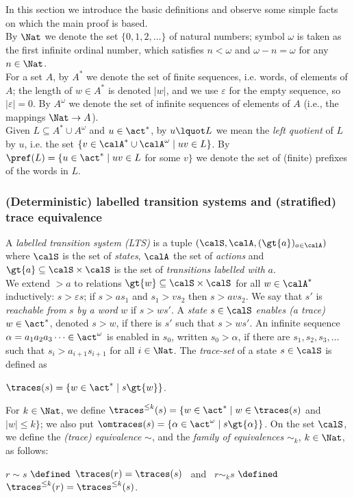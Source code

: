 \documentclass[12pt]{article}
\begin{document}
In this section we introduce the basic definitions and observe 
some simple facts on which the main proof is based. 
\\
By $\Nat$ we denote the 
set $\{0,1,2,\dots\}$ of natural numbers; symbol $\omega$ 
is taken as the first infinite ordinal number,
which satisfies $n<\omega$ and $\omega-n=\omega$ for any
$n\in \Nat$.
\\
For a set $A$, by $A^*$ 
we denote the set of finite sequences, i.e. words, of
elements of $A$; the length of $w\in A^*$ is denoted 
$|w|$,
and we use $\varepsilon$ for the empty sequence,
so $|\varepsilon|=0$.
By $A^{\omega}$ we denote the set of infinite
sequences of
elements of $A$ (i.e., the mappings $\Nat\rightarrow A$).
\\
Given 
$L\subseteq A^*\cup A^{\omega}$
and $u\in\act^*$, by $u\lquot L$ we mean the
\emph{left quotient} of $L$ by $u$, i.e. the set
$\{v\in\calA^*\cup\calA^{\omega}\mid uv\in L\}$. 
By $\pref(L)=\{u\in\act^* \mid uv\in L$ for some
$v\}$ we denote the set of (finite) prefixes of the words in $L$.

\subsubsection*{(Deterministic) labelled transition systems and 
(stratified) trace
equivalence}


A \emph{labelled transition system (LTS)} is a tuple
$(\calS,\calA,(\gt{a})_{a\in\calA} )$
where $\calS$ is the set of \emph{states}, $\calA$ the set of
\emph{actions} 
and $\gt{a}\subseteq \calS\times\calS$ is the set of
\emph{transitions labelled with} $a$.
\\
We extend $\gt{a}$ to relations $\gt{w}\subseteq
\calS\times \calS$ for all $w\in\calA^*$ inductively:
$s\gt{\varepsilon}s$; if $s\gt{a}s_1$ and $s_1\gt{v}s_2$ then
$s\gt{av}s_2$. We say that $s'$ is \emph{reachable 
from} $s$ \emph{by
a word} $w$ if $s\gt{w}s'$.
A \emph{state} $s\in\calS$ \emph{enables (a trace)}
$w\in\act^*$, denoted $s\gt{w}$, if there is $s'$ such that 
 $s\gt{w}s'$. An infinite sequence 
 $\alpha=a_1a_2a_3\dots\in\act^{\omega}$ 
is enabled in $s_0$, written $s_0\gt{\alpha}$, if there are
$s_1,s_2,s_3,\dots$ such that $s_i\gt{a_{i+1}}s_{i+1}$ 
for all $i\in\Nat$.
The \emph{trace-set} of a state $s\in \calS$ is defined as
\begin{center}
$\traces(s)=\{w\in\act^*\mid s\gt{w}\}$. 
\end{center}
For $k\in\Nat$, 
we define
$\traces^{\leq k}(s)=\{w\in\act^*\mid w\in\traces(s)$ and $|w|\leq k\}$;
we also put
$\omtraces(s)=\{\alpha\in\act^{\omega}\mid s\gt{\alpha}\}$.
On the set $\calS$, we define the \emph{(trace) equivalence} $\sim$, and the \emph{family  
of equivalences} $\sim_k$, $k\in\Nat$, as follows:
\begin{center}
$r\sim s$ $\defined$ $\traces(r)=\traces(s)$ 
\ and 
\ $r\sim_k s$ $\defined$ $\traces^{\leq k}(r)=\traces^{\leq k}(s)$.
\end{center}
\end{document}
